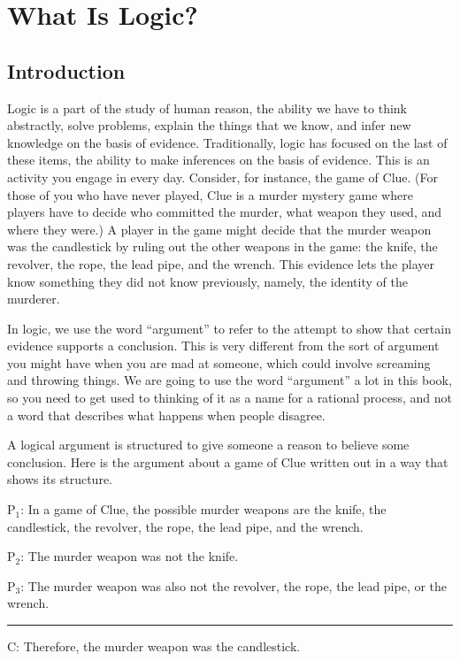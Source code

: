 \chapter{What Is Logic?}
\label{Chap:what_is_logic}


\section{Introduction}

Logic is a part of the study of human reason, the ability we have to think abstractly, solve problems, explain the things that we know, and infer new knowledge on the basis of evidence. Traditionally, logic has focused on the last of these items, the ability to make inferences on the basis of evidence. This is an activity you engage in every day. Consider, for instance, the game of Clue. (For those of you who have never played, Clue is a murder mystery game where players have to decide who committed the murder, what weapon they used, and where they were.) A player in the game might decide that the murder weapon was the candlestick by ruling out the other weapons in the game: the knife, the revolver, the rope, the lead pipe, and the wrench. This evidence lets the player know something they did not know previously, namely, the identity of the murderer.

 In logic, we use the word ``argument'' to refer to the attempt to show that certain evidence supports a conclusion. This is very different from the sort of argument you might have when you are mad at someone, which could involve screaming and throwing things. We are going to use the word ``argument'' a lot in this book, so you need to get used to thinking of it as a name for a rational process, and not a word that describes what happens when people disagree.

A logical argument is structured to give someone a reason to believe some conclusion. Here is the argument about a game of Clue written out in a way that shows its structure. 


\label{argClue}
\begin{earg}
\item[P$_1$:] In a game of Clue, the possible murder weapons are the knife, the candlestick, the revolver, the rope, the lead pipe, and the wrench.
\item[P$_2$:] The murder weapon was not the knife.
\item[P$_3$:] The murder weapon was also not the revolver, the rope, the lead pipe, or the wrench.
\vspace{-.5em}
\item [] \rule{0.9\linewidth}{.5pt} 
\item[C:] Therefore, the murder weapon was the candlestick.
\end{earg} 

